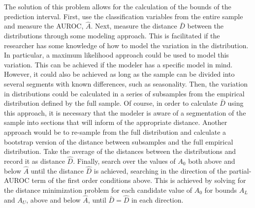 The solution of this problem allows for the calculation of the bounds of the prediction interval.
First, use the classification variables from the entire sample and measure the AUROC, $\hat{A}$.
%
Next, measure the distance $\bar{D}$ between the distributions 
% 
through some modeling approach. 
% 
This is facilitated if the researcher has some knowledge of how to model the variation in the distribution. 
In particular, a maximum likelihood approach could be used to model this variation. 
%
This can be achieved if the modeler has a specific model in mind.
% 
However, it could also be achieved as long as the sample can be divided into several segments with known differences, such as seasonality.
% 
Then, the variation in distributions could be calculated
in a series of subsamples from the empirical distribution defined by the full sample.
% 
Of course, in order to calculate $\bar{D}$ using this approach,
%
it is necessary that the modeler is aware of a segmentation of the sample into sections that will inform of the appropriate distance.
% 
Another approach would be to re-sample from the full distribution and calculate a bootstrap version of the distance between subsamples and the full empirical distribution.
%
Take the average of the distances between the distributions and record it as distance $\hat{D}$.
%
Finally, search over the values of $A_0$ both above and below $\hat{A}$ until the distance $\hat{D}$ is achieved, searching in the direction of the partial-AUROC term of the first order conditions above.
% 
This is achieved by solving for the distance minimization problem for each candidate value of $A_0$ for bounds $A_L$ and $A_U$,
above and below $\hat{A}$, until $\bar{D} = \hat{D}$ in each direction.
%





%
%



